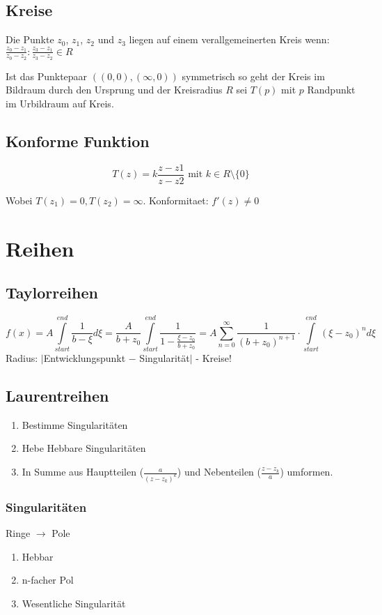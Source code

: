 \documentclass[10pt,a4paper]{article}
\begin{document}
\subsection{Kreise}
Die Punkte $z_0$, $z_1$, $z_2$ und $z_3$ liegen auf einem verallgemeinerten Kreis wenn:
$\frac{z_0-z_1}{z_0-z_2} : \frac{z_3-z_1}{z_3-z_2} \in R$

Ist das Punktepaar $((0,0), (\infty, 0))$ symmetrisch so geht der Kreis im Bildraum durch den Ursprung und der Kreisradius $R$ sei $T(p)$ mit $p$ Randpunkt im Urbildraum auf Kreis.

\subsection{Konforme Funktion}
\[T(z) = k \frac{z-z1}{z-z2} \mbox{ mit } k \in R\setminus \lbrace 0 \rbrace\]

Wobei $T(z_1)=0, T(z_2)=\infty$. Konformitaet: $f'(z) \neq 0$

\section{Reihen}
\subsection{Taylorreihen}
\[
f(x) = A \int\limits_{start}^{end} \frac{1}{b - \xi} d\xi = \frac{A}{b+z_0} \int\limits_{start}^{end} \frac{1}{1- \frac{\xi - z_0}{b+z_0}} = A \sum\limits_{n=0}^\infty \frac{1}{(b+z_0)^{n+1}} \cdot \int\limits_{start}^{end} (\xi-z_0)^n d\xi
\]
Radius: $|$Entwicklungspunkt $ - $ Singularität$|$ - Kreise!

\subsection{Laurentreihen}
\begin{enumerate}
\item Bestimme Singularitäten
\item Hebe Hebbare Singularitäten
\item In Summe aus Hauptteilen ($ \frac{a}{(z-z_k)^k}$) und Nebenteilen ($ \frac{z-z_k}{a}$) umformen.
\end{enumerate}

\subsubsection{Singularitäten}
Ringe $\rightarrow$ Pole
\begin{enumerate}
 \item Hebbar
 \item n-facher Pol
 \item Wesentliche Singularität
\end{enumerate}
\end{document}
